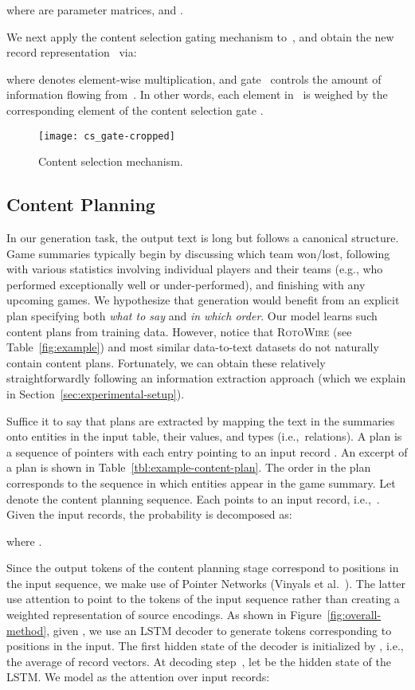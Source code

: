\documentclass[letterpaper]{article} \usepackage{aaai19}  \usepackage{times}  \usepackage{helvet}  \usepackage{courier}  \usepackage{url}  \usepackage{graphicx}  \frenchspacing  \setlength{\pdfpagewidth}{8.5in}  \setlength{\pdfpageheight}{11in}  \graphicspath{ {images/} }
\begin{document}
where  are parameter matrices, and .


We next apply the content selection gating mechanism
to~, and obtain the new record
representation~ via:

where  denotes element-wise multiplication, and gate~ controls the amount of information flowing
from~.  In other words, each element in~
is weighed by the corresponding element of the content selection gate
.


\begin{figure}[t]
\centering
\texttt{[image: cs\_gate-cropped]}
\caption{Content selection mechanism.
\label{fig:content-selection}}
\end{figure}


\subsection{Content Planning}
In our generation task, the output text is long but follows a
canonical structure.  Game summaries typically begin by discussing
which team won/lost, following with various statistics involving
individual players and their teams (e.g., who performed exceptionally
well or under-performed), and finishing with any upcoming games.  We
hypothesize that generation would benefit from an explicit plan
specifying both {\it what to say} and {\it in which order}. Our model
learns such content plans from training data.  However, notice that
\textsc{RotoWire} (see Table~\ref{fig:example}) and most similar
data-to-text datasets do not naturally contain content plans.
Fortunately, we can obtain these relatively straightforwardly
following an information extraction approach (which we explain in
Section~\ref{sec:experimental-setup}).

Suffice it to say that plans are extracted by mapping the text in the
summaries onto entities in the input table, their values, and types
(i.e.,~relations). A plan is a sequence of pointers with each entry
pointing to an input record .  An excerpt of a
plan is shown in Table~\ref{tbl:example-content-plan}. The order in
the plan corresponds to the sequence in which entities appear in the
game summary. Let  denote the content planning
sequence.  Each  points to an input record, i.e.,~.  Given the input records, the probability  is
decomposed as:

where .

Since the output tokens of the content planning stage correspond to
positions in the input sequence, we make use of Pointer Networks
(Vinyals et al.~\citeyear{NIPS2015_5866}). The latter use attention to
point to the tokens of the input sequence rather than creating a
weighted representation of source encodings. As shown in
Figure~\ref{fig:overall-method}, given , we use
an LSTM decoder to generate tokens corresponding to positions in the
input.  The first hidden state of the decoder is initialized by , i.e., the average of record
vectors.  At decoding step~, let  be the hidden state
of the LSTM.  We model  as the attention over
input records:
\end{document}

